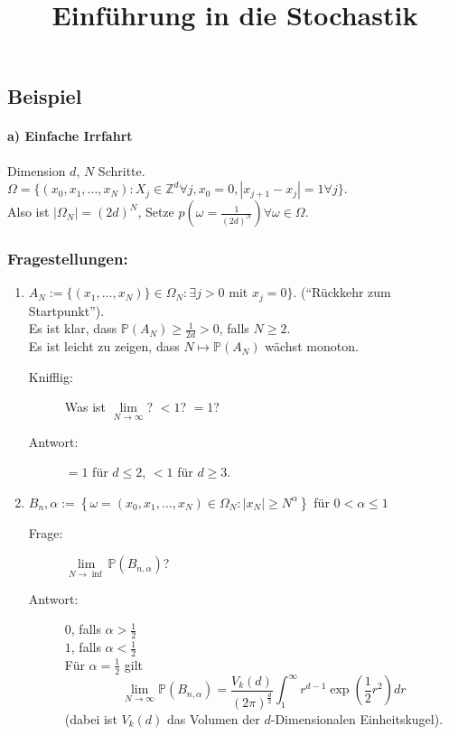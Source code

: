 \documentclass[10pt,a4paper]{article}
\title{Einführung in die Stochastik}
\author{}
\newcommand{\Z}{\ensuremath{\mathbb{Z}}}
\newcommand{\al}{\ensuremath{\alpha}}
\newcommand{\Prb}{\mathbb P}
\newcounter{thm}[section]
\let\oldsubsection\subsection
\renewcommand{\subsection}{\stepcounter{thm}\oldsubsection}
\theoremstyle{definition}
\theoremstyle{plain}
\theoremstyle{remark}
\begin{document}
	\maketitle
	\tableofcontents
	
	\setcounter{section}{1}
	\setcounter{thm}{10}
	\subsection{Beispiel}
	\paragraph*{a) Einfache Irrfahrt} Dimension $d$, $N$ Schritte. $\Omega=\{(x_0,x_1,...,x_N):X_j\in\Z^d\forall j, x_0=0,|x_{j+1}-x_j|=1\forall j\}$.\\
	Also ist $|\Omega_N|=(2d)^N$, Setze $p(\omega=\frac{1}{(2d)^N})\forall\omega\in\Omega$.
	\subsubsection*{Fragestellungen:}
	\begin{enumerate}
		\item $A_N:=\{(x_1,...,x_N)\}\in\Omega_N:\exists j>0$ mit $x_j=0\}$. (``Rückkehr zum Startpunkt'').\\
		Es ist klar, dass $\Prb(A_N)\ge\frac{1}{2d}>0$, falls $N\ge 2$.\\
		Es ist leicht zu zeigen, dass $N\mapsto\mathbb{P}(A_N)$ wächst monoton.\\
		\begin{description}
			\item[Knifflig:] Was ist $\lim\limits_{N\to\infty}$? $<1$? $=1$?
			\item[Antwort:] $=1$ für $d\leq 2$, $<1$ für $d\geq 3$.
		\end{description}
		\item $B_n,\al:=\left\{\omega=(x_0,x_1,...,x_N)\in\Omega_N:|x_N|\ge N^\alpha\right\}$ für $0<\alpha\leq 1$
		\begin{description}
			\item[Frage:] $\lim\limits_{N\to\inf}\Prb(B_{n,\al})$?
			\item[Antwort:] $0$, falls $\alpha>\frac{1}{2}$\\
			$1$, falls $\alpha< \frac{1}{2}$\\
			Für $\alpha=\frac{1}{2}$ gilt 
			\[\lim\limits_{N\to\infty}\Prb(B_{n,\al})=\frac{V_k(d)}{(2\pi)^{\frac{d}{2}}}\int_{1}^{\infty}r^{d-1}\exp(\frac{1}{2}r^2)dr\]
			(dabei ist $V_k(d)$ das Volumen der $d$-Dimensionalen Einheitskugel).
		\end{description}
	\end{enumerate}
\end{document}
